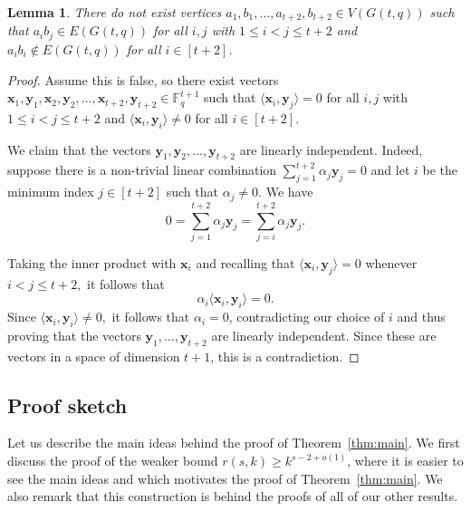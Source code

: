 \documentclass{article}
\theoremstyle{plain}
\newtheorem{lemma}[theorem]{Lemma}
\theoremstyle{definition}
\newcommand{\bF}{\mathbb{F}}
\newcommand{\bx}{\mathbf{x}}
\newcommand{\by}{\mathbf{y}}
\begin{document}
\begin{lemma} \label{lem:Hs-free}
    There do not exist vertices $a_1, b_1, \dots, a_{t+2}, b_{t+2} \in V(G(t, q))$ such that $a_ib_j \in E(G(t, q))$ for all $i, j$ with $1 \le i < j \le t+2$ and $a_i b_i \not\in E(G(t, q))$ for all $i \in [t+2]$.
\end{lemma}
\begin{proof}
    Assume this is false, so there exist vectors $\bx_1, \by_1, \bx_2, \by_2, \dots, \bx_{t+2}, \by_{t+2} \in \bF_q^{t+1}$ such that $\langle \bx_i, \by_j \rangle = 0$ for all $i, j$ with $1 \le i < j \le t+2$ and $\langle \bx_i, \by_i \rangle \neq 0$ for all $i \in [t+2]$.
    
    We claim that the vectors $\by_1, \by_2, \dots, \by_{t+2}$ are linearly independent. Indeed, suppose there is a non-trivial linear combination $\sum_{j=1}^{t+2} \alpha_j \by_j = 0$ and let $i$ be the minimum index $j \in [t+2]$ such that $\alpha_j \neq 0$. We have
    \[ 0 = \sum_{j=1}^{t+2} \alpha_j \by_j = \sum_{j=i}^{t+2} \alpha_j \by_j. \]

    Taking the inner product with $\bx_i$ and recalling that $\langle \bx_i, \by_j \rangle = 0$ whenever $i < j \le t+2,$ it follows that
    \[ \alpha_i \langle \bx_i, \by_i \rangle = 0. \]
    Since $\langle \bx_i, \by_i \rangle \neq 0,$ it follows that $\alpha_i = 0$, contradicting our choice of $i$ and thus proving that the vectors $\by_1, \dots, \by_{t+2}$ are linearly independent. Since these are vectors in a space of dimension $t+1$, this is a contradiction.
\end{proof}

\subsection{Proof sketch} \label{subsec:sketch}
    Let us describe the main ideas behind the proof of Theorem~\ref{thm:main}. We first discuss the proof of the weaker bound $r(s, k) \ge k^{s-2+o(1)}$, where it is easier to see the main ideas and which motivates the proof of Theorem~\ref{thm:main}. We also remark that this construction is behind the proofs of all of our other results.
    
\end{document}
